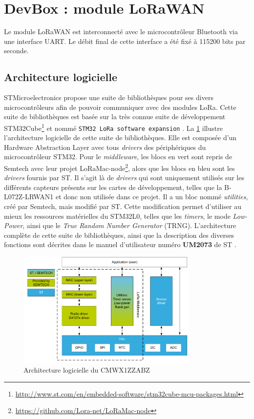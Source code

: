 \FloatBarrier
\newpage
\section{DevBox : module LoRaWAN}
\label{sec-soft_devbox}


Le module LoRaWAN est interconnecté avec le microcontrôleur Bluetooth via une interface UART. Le débit final de cette interface a été fixé à 115200 bits 
par seconde.

\subsection{Architecture logicielle}


STMicroelectronics propose une suite de bibliothèques pour ses divers microcontrôleurs afin de pouvoir communiquer avec des modules LoRa. Cette suite de bibliothèques est basée sur la très connue suite de développement STM32Cube\footnote{\url{http://www.st.com/en/embedded-software/stm32cube-mcu-packages.html}} et nommé \texttt{STM32 LoRa software expansion} \cite{STM32LoR36:online}. La \cref{fig-murata_lorawan_architecture} illustre l'architecture logicielle de cette suite de bibliothèques. Elle est composée d'un Hardware Abstraction Layer avec tous \textit{drivers} des périphériques du microcontrôleur STM32. Pour le \textit{middleware}, les blocs en vert sont repris de Semtech avec leur projet LoRaMac-node\footnote{\url{https://github.com/Lora-net/LoRaMac-node}}, alors que les blocs en bleu sont les \textit{drivers} fournis par ST. Il s'agit là de \textit{drivers} qui sont uniquement utilisés sur les différents capteurs présents sur les cartes de développement, telles que la B-L072Z-LRWAN1 et donc non utilisée dans ce projet. Il a un bloc nommé \textit{utilities}, créé par Semtech, mais modifié par ST. Cette modification permet d'utiliser au mieux les ressources matérielles du STM32L0, telles que les \textit{timers}, le mode \textit{Low-Power}, ainsi que le \textit{True Random Number Generator} (TRNG). L'architecture complète de cette suite de bibliothèques, ainsi que la description des diverses fonctions sont décrites dans le manuel d'utilisateur numéro \textbf{UM2073} de ST \cite{STM32LoR36:online}. 

\begin{figure}[ht!]
    \centering
    \includegraphics[width=0.8\textwidth]{Figures/Software/LoRaWAN/murata_lorawan_architecture.png}
    \caption{Architecture logicielle du CMWX1ZZABZ}
    \label{fig-murata_lorawan_architecture}
\end{figure}



